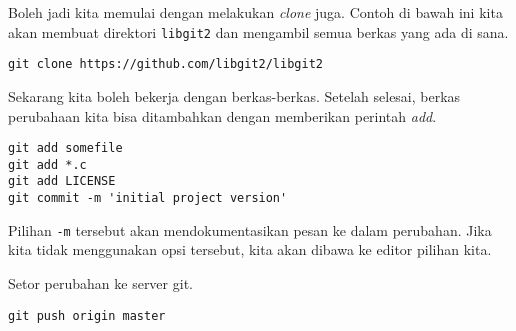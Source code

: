 Boleh jadi kita memulai dengan melakukan {\em clone} juga.
Contoh di bawah ini kita akan membuat direktori \texttt{libgit2}
dan mengambil semua berkas yang ada di sana.
\begin{lstlisting}
git clone https://github.com/libgit2/libgit2
\end{lstlisting}

Sekarang kita boleh bekerja dengan berkas-berkas.
Setelah selesai, berkas perubahaan kita bisa ditambahkan
dengan memberikan perintah {\em add}.

\begin{lstlisting}
git add somefile
git add *.c
git add LICENSE
git commit -m 'initial project version'
\end{lstlisting}
Pilihan \texttt{-m} tersebut akan mendokumentasikan pesan ke dalam
perubahan. Jika kita tidak menggunakan opsi tersebut, kita akan
dibawa ke editor pilihan kita.

Setor perubahan ke server git.

\begin{lstlisting}
git push origin master
\end{lstlisting}
